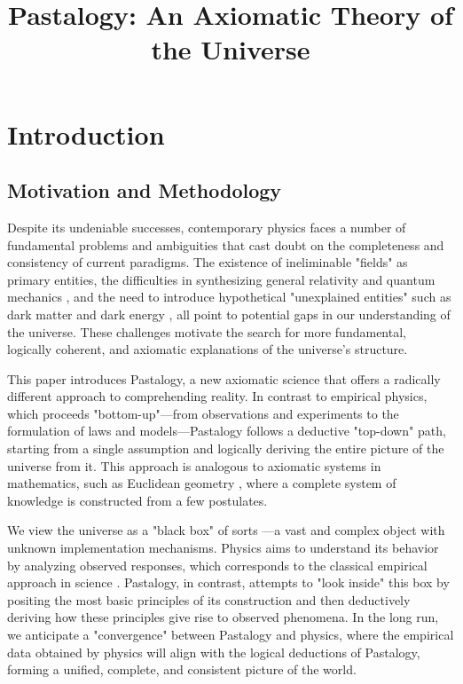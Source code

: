 \documentclass[pdflatex,sn-mathphys-num,referee]{sn-jnl}
\title[Pastalogy]{Pastalogy: An Axiomatic Theory of the Universe}
\author*[1]{\fnm{Vladimir} \sur{Sitnikov}}\email{montenegrofsm@google.com}
\affil*[1]{\orgdiv{Independent Researcher}, \city{Bar}, \country{Montenegro}}
\begin{document}
\maketitle

\section{Introduction}\label{sec:introduction}

\subsection{Motivation and Methodology}\label{subsec:motivation-methodology}

Despite its undeniable successes, contemporary physics faces a number of fundamental problems and ambiguities that cast doubt on the completeness and consistency of current paradigms. The existence of ineliminable "fields" as primary entities, the difficulties in synthesizing general relativity \cite{einstein1916} and quantum mechanics \cite{bohr1928}, and the need to introduce hypothetical "unexplained entities" such as dark matter \cite{rubin1980} and dark energy \cite{riess1998}, all point to potential gaps in our understanding of the universe. These challenges motivate the search for more fundamental, logically coherent, and axiomatic explanations of the universe's structure.

This paper introduces Pastalogy, a new axiomatic science that offers a radically different approach to comprehending reality. In contrast to empirical physics, which proceeds "bottom-up"---from observations and experiments to the formulation of laws and models---Pastalogy follows a deductive "top-down" path, starting from a single assumption and logically deriving the entire picture of the universe from it. This approach is analogous to axiomatic systems in mathematics, such as Euclidean geometry \cite{euclid-elements-heath}, where a complete system of knowledge is constructed from a few postulates.

We view the universe as a "black box" of sorts \cite{wiener1948}---a vast and complex object with unknown implementation mechanisms. Physics aims to understand its behavior by analyzing observed responses, which corresponds to the classical empirical approach in science \cite{popper1959}. Pastalogy, in contrast, attempts to "look inside" this box by positing the most basic principles of its construction and then deductively deriving how these principles give rise to observed phenomena. In the long run, we anticipate a "convergence" between Pastalogy and physics, where the empirical data obtained by physics will align with the logical deductions of Pastalogy, forming a unified, complete, and consistent picture of the world.
\end{document}
